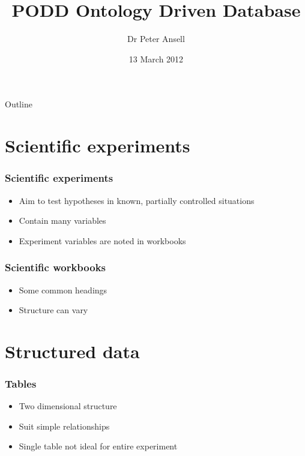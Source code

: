 \documentclass[12pt]{beamer}
\title{PODD Ontology Driven Database}
\author{Dr Peter Ansell}
\institute{University of Queensland}
\date{13 March 2012}
\begin{document}
\begin{frame}
\titlepage
\end{frame}

\begin{frame}{Outline}
  \tableofcontents
\end{frame}

\section{Scientific experiments}

\begin{frame}
\frametitle{Scientific experiments}

\begin{itemize}
 \item Aim to test hypotheses in known, partially controlled situations
\pause
 \item Contain many variables
\pause
 \item Experiment variables are noted in workbooks
\end{itemize}

\end{frame}

\begin{frame}
\frametitle{Scientific workbooks}

\begin{itemize}
 \item Some common headings
\pause
 \item Structure can vary
\end{itemize}

\end{frame}

\section{Structured data}

\begin{frame}
\frametitle{Tables}

\begin{itemize}
 \item Two dimensional structure
\pause
 \item Suit simple relationships
\pause
 \item Single table not ideal for entire experiment
\end{itemize}

\end{frame}
\end{document}
